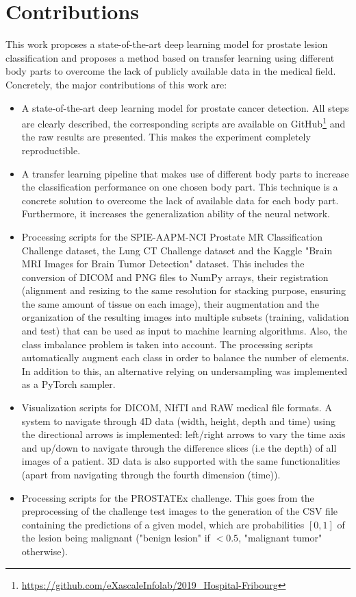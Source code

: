 \section{Contributions}

\setlength{\marginparwidth}{3cm}\leavevmode {}This work proposes a state-of-the-art deep learning model for prostate lesion classification and proposes a method based on transfer learning using different body parts to overcome the lack of publicly available data in the medical field. Concretely, the major contributions of this work are:
\begin{itemize}
\item A state-of-the-art deep learning model for prostate cancer detection. All steps are clearly described, the corresponding scripts are available on GitHub\footnote{\url{https://github.com/eXascaleInfolab/2019_Hospital-Fribourg}} and the raw results are presented. This makes the experiment completely reproductible. 

\item A transfer learning pipeline that makes use of different body parts to increase the classification performance on one chosen body part. This technique is a concrete solution to overcome the lack of available data for each body part. Furthermore, it increases the generalization ability of the neural network.


\item Processing scripts for the SPIE-AAPM-NCI Prostate MR Classification Challenge dataset, the Lung CT Challenge dataset and the Kaggle "Brain MRI Images for Brain Tumor Detection" dataset. This includes the conversion of DICOM and PNG files to NumPy arrays, their registration (alignment and resizing to the same resolution for stacking purpose, ensuring the same amount of tissue on each image), their augmentation and the organization of the resulting images into multiple subsets (training, validation and test) that can be used as input to machine learning algorithms. Also, the class imbalance problem is taken into account. The processing scripts automatically augment each class in order to balance the number of elements. In addition to this, an alternative relying on undersampling was implemented as a PyTorch sampler.

\item Visualization scripts for DICOM, NIfTI and RAW medical file formats. A system to navigate through 4D data (width, height, depth and time) using the directional arrows is implemented: left/right arrows to vary the time axis and up/down to navigate through the difference slices (i.e the depth) of all images of a patient. 3D data is also supported with the same functionalities (apart from navigating through the fourth dimension (time)). 


\item Processing scripts for the PROSTATEx challenge. This goes from the preprocessing of the challenge test images to the generation of the CSV file containing the predictions of a given model, which are probabilities $[0,1]$ of the lesion being malignant ("benign lesion" if $< 0.5$, "malignant tumor" otherwise).

\end{itemize}
